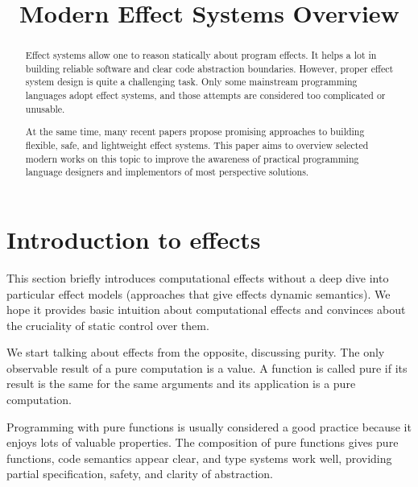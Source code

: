 \documentclass[conference]{IEEEtran}
\begin{document}
    \title{Modern Effect Systems Overview
    }

    \author{
    }


    \maketitle


    \begin{abstract}
        Effect systems allow one to reason statically about program effects.
        It helps a lot in building reliable software and clear code abstraction boundaries.
        However, proper effect system design is quite a challenging task.
        Only some mainstream programming languages adopt effect systems, and those attempts are considered too complicated or unusable.

        At the same time, many recent papers propose promising approaches to building flexible, safe, and lightweight effect systems.
        This paper aims to overview selected modern works on this topic to improve the awareness of practical programming language designers and implementors of most perspective solutions.
    \end{abstract}


    \section{Introduction to effects}

    This section briefly introduces computational effects without a deep dive into particular effect models (approaches that give effects dynamic semantics).
    We hope it provides basic intuition about computational effects and convinces about the cruciality of static control over them.

    We start talking about effects from the opposite, discussing purity.
    The only observable result of a pure computation is a value.
    A function is called pure if its result is the same for the same arguments and its application is a pure computation.

    Programming with pure functions is usually considered a good practice because it enjoys lots of valuable properties.
    The composition of pure functions gives pure functions, code semantics appear clear, and type systems work well, providing partial specification, safety, and clarity of abstraction.
\end{document}
